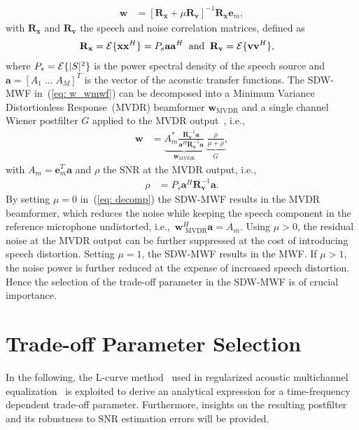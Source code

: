 \documentclass[10pt]{IEEEtran}
\begin{document}
\begin{align}
  \label{eq: w_wmwf}
  \mathbf{w} & = \left[ \mathbf{R}_{\mathbf{x}} + \mu \mathbf{R}_{\mathbf{v}} \right]^{-1} \mathbf{R}_{\mathbf{x}}\mathbf{e}_m,
\end{align}
with $\mathbf{R}_{\mathbf{x}}$ and $\mathbf{R}_{\mathbf{v}}$ the speech and noise correlation matrices, defined as
\begin{align}
  \label{eq: corr}
  \mathbf{R}_{\mathbf{x}} & = {\cal{E}}\{ \mathbf{x}\mathbf{x}^H \} = P_s \mathbf{a} \mathbf{a}^H \; \; \text{and} \; \; \mathbf{R}_{\mathbf{v}} = {\cal{E}} \{ \mathbf{v}\mathbf{v}^H \},
\end{align}
where $P_s = {\cal{E}} \{|S|^2 \}$ is the power spectral density of the speech source and $\mathbf{a} = [A_1 \; \ldots \; A_M]^T$ is the vector of the acoustic transfer functions.
The SDW-MWF in~(\ref{eq: w_wmwf}) can be decomposed into a Minimum Variance Distortionless Response~(MVDR) beamformer $\mathbf{w}_{\text{MVDR}}$ and a single channel Wiener postfilter $G$ applied to the MVDR output~\cite{Simmer_book_2001}, i.e.,
\begin{align}
  \label{eq: decomp}
  \mathbf{w} &= \underbrace{A_m^{*}\frac{\mathbf{R}^{-1}_{\mathbf{v}}\mathbf{a}}{\mathbf{a}^H \mathbf{R}^{-1}_{\mathbf{v}}\mathbf{a}}}_{\mathbf{w}_\text{MVDR}} \; \underbrace{\frac{\rho}{\mu + \rho}}_{G},
\end{align}
with $A_m = \mathbf{e}_m^T \mathbf{a}$ and $\rho$ the SNR at the MVDR output, i.e., 
\begin{align}
\label{eq: rho}
\rho &= P_s \mathbf{a}^H\mathbf{R}^{-1}_{\mathbf{v}}\mathbf{a}.
\end{align}
By setting $\mu = 0$ in~(\ref{eq: decomp}) the SDW-MWF results in the MVDR beamformer, which reduces the noise while keeping the speech component in the reference microphone undistorted, i.e.,~$\mathbf{w}_{{\text{ MVDR}}}^H \mathbf{a} = A_m$.
Using $\mu > 0$, the residual noise at the MVDR output can be further suppressed at the cost of introducing speech distortion.
Setting $\mu=1$, the SDW-MWF results in the MWF. 
If $\mu > 1$, the noise power is further reduced at the expense of increased speech distortion. 
Hence the selection of the trade-off parameter in the SDW-MWF is of crucial importance. 

\section{Trade-off Parameter Selection}
\label{sec: par}
In the following, the L-curve method~\cite{Hansen_SIAM_1993} used in regularized acoustic multichannel equalization~\cite{Kodrasi_ITASLP_2013} is exploited to derive an analytical expression for a time-frequency dependent trade-off parameter.
Furthermore, insights on the resulting postfilter and its robustness to SNR estimation errors will be provided.
\end{document}

